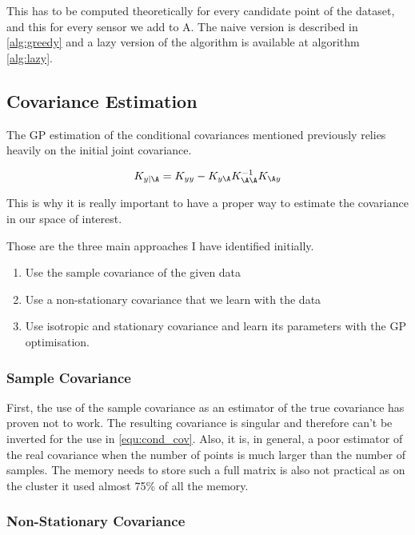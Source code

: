 This has to be computed theoretically for every candidate point of the dataset, and this for every sensor we add to A. The naive version is described in \ref{alg:greedy} and a lazy version of the algorithm is available at algorithm \ref{alg:lazy}.

\subsection{Covariance Estimation}

The GP estimation of the conditional covariances mentioned previously relies heavily on the initial joint covariance. 

\begin{equation}
    K_{y | \A} = K_{yy} - K_{y\A} K_{\A\A}^{-1} K_{\A y} \label{equ:cond_cov}
\end{equation}

This is why it is really important to have a proper way to estimate the covariance in our space of interest. 

Those are the three main approaches I have identified initially. 

\begin{enumerate}
    \item Use the sample covariance of the given data
    \item Use a non-stationary covariance that we learn with the data
    \item Use isotropic and stationary covariance and learn its parameters with the GP optimisation. 
\end{enumerate}

\subsubsection{Sample Covariance}
First, the use of the sample covariance as an estimator of the true covariance has proven not to work. The resulting covariance is singular and therefore can't be inverted for the use in \ref{equ:cond_cov}. Also, it is, in general, a poor estimator of the real covariance when the number of points is much larger than the number of samples. The memory needs to store such a full matrix is also not practical as on the cluster it used almost 75\% of all the memory. \\

\subsubsection{Non-Stationary Covariance}

